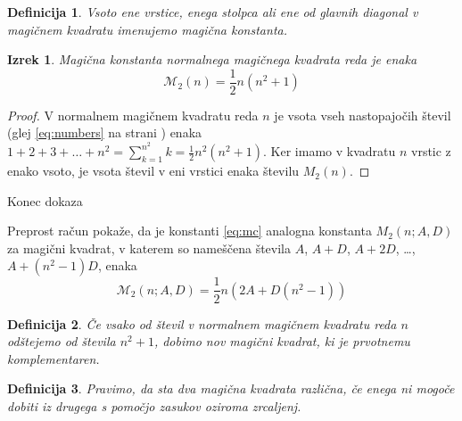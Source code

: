 \documentclass[a4paper,12pt]{article}
\newtheorem{definicija}{Definicija}
\newtheorem{izrek}{Izrek}
\newcommand{\m}{\mathcal{M}_2}
\begin{document}
\begin{definicija}
      Vsoto ene vrstice, enega stolpca ali ene od glavnih diagonal
      v magičnem kvadratu imenujemo \emph{magična konstanta}.
\end{definicija}

   
   \begin{izrek}
      
      Magična konstanta normalnega magičnega kvadrata reda
      je enaka
      \begin{equation}
         \label{eq:mc}
         \m(n)=\frac{1}{2}n(n^2+1)
      \end{equation}
   \end{izrek}
      
   
   \begin{proof}
      V normalnem magičnem kvadratu reda \(n\) je vsota vseh nastopajočih
      števil (glej \eqref{eq:numbers} na strani \pageref{eq:numbers}) enaka
      \(1+2+3+\ldots+n^2=\sum_{k=1}^{n^2}k=\frac{1}{2}n^2(n^2+1)\). Ker imamo
      v kvadratu \(n\) vrstic z enako vsoto, je vsota števil v eni vrstici
      enaka številu \(M_2(n)\). %
   \end{proof} Konec dokaza

Preprost račun pokaže, da je konstanti \eqref{eq:mc} analogna konstanta
\(M_2(n;A,D)\) za magični kvadrat, v katerem so nameščena števila
\(A\), \(A+D\), \(A+2D\), \ldots, \(A+(n^2-1)D\), enaka %
\[\m(n;A,D)=\frac{1}{2}n(2A+D(n^2-1))\]

\begin{definicija}
      Če vsako od števil v normalnem magičnem kvadratu reda \(n\) odštejemo
      od števila \(n^2+1\), dobimo nov magični kvadrat, ki je prvotnemu
      \emph{komplementaren}.
\end{definicija}

\begin{definicija}
      Pravimo, da sta dva magična kvadrata \emph{različna}, če enega ni mogoče dobiti
      iz drugega s pomočjo zasukov oziroma zrcaljenj.
\end{definicija}
\end{document}
